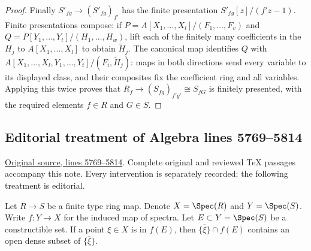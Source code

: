 \begin{proof}
\medskip\noindent
Finally $S'_{fg}\to(S'_{fg})_{f'}$ has the finite presentation
$S'_{fg}[z]/(f'z-1)$. Finite presentations compose: if
$P=A[X_1,\ldots,X_l]/(F_1,\ldots,F_v)$ and
$Q=P[Y_1,\ldots,Y_t]/(H_1,\ldots,H_w)$, lift each of the finitely
many coefficients in the $H_j$ to $A[X_1,\ldots,X_l]$ to obtain
$\widetilde H_j$. The canonical map identifies
$Q$ with $A[X_1,\ldots,X_l,Y_1,\ldots,Y_t]/(F_i,\widetilde H_j)$:
maps in both directions send every variable to its displayed class,
and their composites fix the coefficient ring and all variables.
Applying this twice proves that
$R_f\to(S_{fg})_{f'g'}\cong S_{fG}$ is finitely presented, with
the required elements $f\in R$ and $G\in S$.
\end{proof}


\subsection{Editorial treatment of Algebra lines 5769--5814}

\hypertarget{algebra-context-040}{}

\noindent\href{https://github.com/stacks/stacks-project/blob/a04446e57ec1fbc252a871afcec7752fb2807b14/algebra.tex\#L5769}{Original source, lines 5769--5814}. Complete original and reviewed TeX passages accompany this note. Every intervention is separately recorded; the following treatment is editorial.


\begin{lemma}
\label{editorial-source-lemma-characterize-image-finite-type}
Let $R \to S$ be a finite type ring map.
Denote $X = \Spec(R)$ and $Y = \Spec(S)$.
Write $f : Y \to X$ for the induced
map of spectra. Let $E \subset Y = \Spec(S)$ be a
constructible set.
If a point $\xi \in X$ is in $f(E)$, then
$\overline{\{\xi\}} \cap f(E)$ contains an open
dense subset of $\overline{\{\xi\}}$.
\end{lemma}

